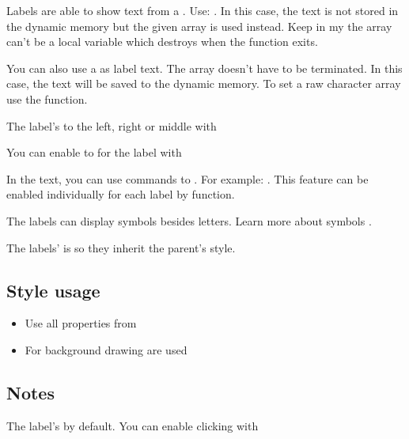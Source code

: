 \documentclass[letterpaper,10pt,english]{sphinxmanual}
\begin{document}
Labels are able to show text from a . Use: . In this case, the text is not stored in the dynamic memory but the given array is used instead. Keep in my the array can’t be a local variable which destroys when the function exits.

You can also use a  as label text. The array doesn’t have to be  terminated. In this case, the text will be saved to the dynamic memory. To set a raw character array use the  function.

The label’s  to the left, right or middle with 

You can enable to  for the label with 

In the text, you can use commands to . For example: . This feature can be enabled individually for each label by  function.

The labels can display symbols besides letters. Learn more about symbols .

The labels’  is  so they inherit the parent’s style.


\subsection{Style usage}
\label{\detokenize{object-types/label:style-usage}}\begin{itemize}
\item {} 
Use all properties from 

\item {} 
For background drawing  are used

\end{itemize}


\subsection{Notes}
\label{\detokenize{object-types/label:notes}}
The label’s  by default. You can enable clicking with 
\end{document}
